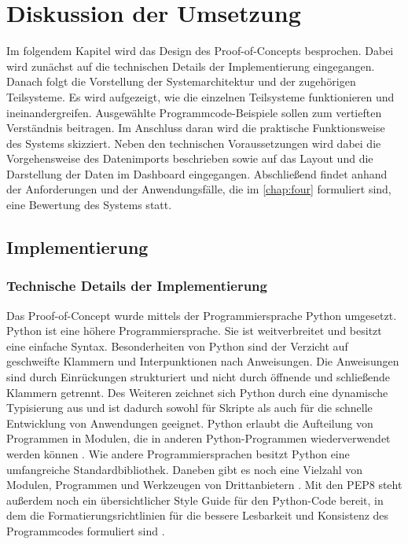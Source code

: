 \chapter{Diskussion der Umsetzung}
\label{chap:five}
Im folgendem Kapitel wird das Design des Proof-of-Concepts besprochen. Dabei wird zunächst auf die technischen Details der
Implementierung eingegangen. Danach folgt die Vorstellung der Systemarchitektur und der zugehörigen Teilsysteme.
Es wird aufgezeigt, wie die einzelnen Teilsysteme funktionieren und ineinandergreifen. Ausgewählte Programmcode-Beispiele sollen zum  
vertieften Verständnis beitragen.
Im Anschluss daran wird die praktische Funktionsweise des Systems skizziert. Neben den technischen Voraussetzungen wird dabei 
die Vorgehensweise des Datenimports beschrieben sowie auf das Layout und die Darstellung der Daten im Dashboard eingegangen. 
Abschließend findet anhand der Anforderungen und der Anwendungsfälle, die im \autoref{chap:four} formuliert sind, eine Bewertung des Systems statt.


\section{Implementierung}
    
    \subsection{Technische Details der Implementierung}
    Das Proof-of-Concept wurde mittels der Programmiersprache Python umgesetzt.
    Python ist eine höhere Programmiersprache. Sie ist weitverbreitet \cite[vgl.][]{loukides_where_2021} und besitzt
    eine einfache Syntax. Besonderheiten von Python sind der Verzicht auf geschweifte Klammern und Interpunktionen nach Anweisungen.
    Die Anweisungen sind durch Einrückungen strukturiert und nicht durch öffnende und schließende Klammern
    getrennt. Des Weiteren zeichnet sich Python durch eine dynamische Typisierung aus und ist dadurch sowohl für Skripte als auch 
    für die schnelle Entwicklung von Anwendungen geeignet. Python erlaubt die Aufteilung von Programmen in Modulen, die in anderen Python-Programmen wiederverwendet werden können
    \cite[vgl.][]{python_6_2021}.
    Wie andere Programmiersprachen besitzt Python eine umfangreiche Standardbibliothek.
    Daneben gibt es noch eine Vielzahl von Modulen, Programmen und Werkzeugen von Drittanbietern \cite[vgl.][]{python_pypi_2021}.
    Mit den \acrfull{PEP8} steht außerdem noch ein übersichtlicher Style Guide für den Python-Code bereit, in dem die Formatierungsrichtlinien für die bessere Lesbarkeit und Konsistenz des Programmcodes formuliert sind \cite[vgl.][]{rossum_pep_2021}.

